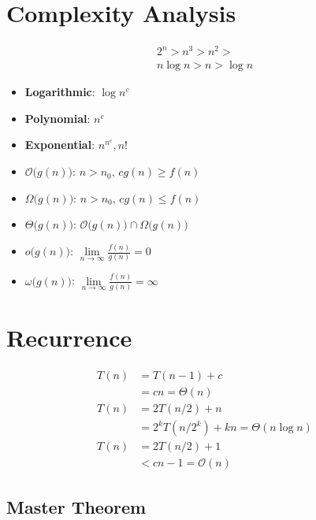 \documentclass[11pt]{article}
\begin{document}
\begin{multicols}{4}

\section{Complexity Analysis}

\begin{gather*}
	2^{n} > n^3 > n^2 > \\
	n\log{n} > n > \log{n}
\end{gather*}

\begin{itemize}
	\item \textbf{Logarithmic}: $\log{n}^c$
	\item \textbf{Polynomial}: $n^c$
	\item \textbf{Exponential}: $n^{n^c}, n!$
\end{itemize}

\begin{itemize}
	\item $\mathcal{O}\bigl(g(n)\bigr)$: $n > n_0,\, cg(n) \ge f(n)$
	\item $\Omega\bigl(g(n)\bigr)$: $n > n_0,\, cg(n) \le f(n)$
	\item $\Theta\bigl(g(n)\bigr)$: $\mathcal{O}\bigl(g(n)\bigr) \cap \Omega\bigl(g(n)\bigr)$
	\item $o\bigl(g(n)\bigr)$: $\lim\limits_{n \to \infty} \frac{f(n)}{g(n)} = 0$
	\item $\omega\bigl(g(n)\bigr)$: $\lim\limits_{n \to \infty} \frac{f(n)}{g(n)} = \infty$
\end{itemize}

\section{Recurrence}

\begin{align*}
	T(n) &= T(n-1) + c \\
	&= cn = \Theta(n) \\
	T(n) &= 2T(n/2) + n \\
	&= 2^{k}T(n/2^{k}) + kn = \Theta(n\log{n}) \\
	T(n) &= 2T(n/2) + 1 \\
	&< cn-1 = \mathcal{O}(n)
\end{align*}

\subsection{Master Theorem}


\end{multicols}
\end{document}
